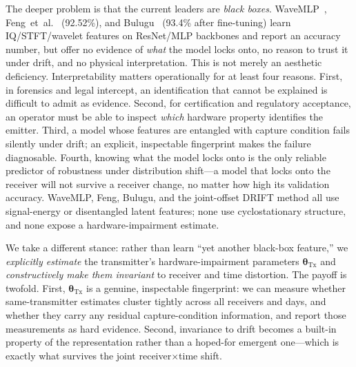 \documentclass[journal]{IEEEtran}
\newcommand{\tx}{\boldsymbol{\theta}_{\mathrm{Tx}}}
\begin{document}
The deeper problem is that the current leaders are \emph{black boxes}. WaveMLP~\cite{wavemlp}, Feng~et~al.~\cite{feng2025} (92.52\%), and Bulugu~\cite{bulugu2025} (93.4\% after fine-tuning) learn IQ/STFT/wavelet features on ResNet/MLP backbones and report an accuracy number, but offer no evidence of \emph{what} the model locks onto, no reason to trust it under drift, and no physical interpretation. This is not merely an aesthetic deficiency. Interpretability matters operationally for at least four reasons. First, in forensics and legal intercept, an identification that cannot be explained is difficult to admit as evidence. Second, for certification and regulatory acceptance, an operator must be able to inspect \emph{which} hardware property identifies the emitter. Third, a model whose features are entangled with capture condition fails silently under drift; an explicit, inspectable fingerprint makes the failure diagnosable. Fourth, knowing what the model locks onto is the only reliable predictor of robustness under distribution shift---a model that locks onto the receiver will not survive a receiver change, no matter how high its validation accuracy. WaveMLP, Feng, Bulugu, and the joint-offset DRIFT method all use signal-energy or disentangled latent features; none use cyclostationary structure, and none expose a hardware-impairment estimate.

We take a different stance: rather than learn ``yet another black-box feature,'' we \emph{explicitly estimate} the transmitter's hardware-impairment parameters $\tx$ and \emph{constructively make them invariant} to receiver and time distortion. The payoff is twofold. First, $\tx$ is a genuine, inspectable fingerprint: we can measure whether same-transmitter estimates cluster tightly across all receivers and days, and whether they carry any residual capture-condition information, and report those measurements as hard evidence. Second, invariance to drift becomes a built-in property of the representation rather than a hoped-for emergent one---which is exactly what survives the joint receiver$\times$time shift.
\end{document}
